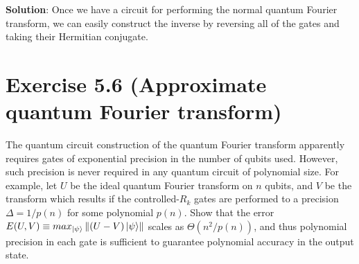 \documentclass{book}
\begin{document}
    \textbf{Solution}: Once we have a circuit for performing the normal quantum Fourier transform, we can easily construct the inverse by reversing all of the gates and taking their Hermitian conjugate. 

\section*{Exercise 5.6 (Approximate quantum Fourier transform)}
    The quantum circuit construction of the quantum Fourier transform apparently requires gates of exponential precision in the number of qubits used. However, such precision is never required in any quantum circuit of polynomial size. For example, let $U$ be the ideal quantum Fourier transform on $n$ qubits, and $V$ be the transform which results if the controlled-$R_k$ gates are performed to a precision $\Delta = 1/p(n)$ for some polynomial $p(n)$. Show that the error $E(U, V) \equiv max_{\ket{\psi}} \left\|(U - V)\ket{\psi}\right\|$ scales as $\Theta(n^2/p(n))$, and thus polynomial precision in each gate is sufficient to guarantee polynomial accuracy in the output state.
\end{document}
